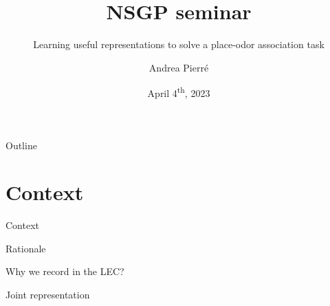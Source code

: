 \documentclass[bigger]{beamer}
\author{Andrea Pierré}
\date{April 4\textsuperscript{th}, 2023}
\title{NSGP seminar}
\subtitle{Learning useful representations to solve a place-odor association task}
\institute{Brown University}
\begin{document}
\maketitle
\begin{frame}[plain]{Outline}
\tableofcontents
\end{frame}

\section{Context}
\label{sec:orgff87777}
\begin{frame}[label={sec:orge12060c}]{Context}
\end{frame}
\begin{frame}[label={sec:orgd08aaca}]{Rationale}
\begin{block}{Why we record in the LEC?}
\end{block}
\end{frame}
\begin{frame}[label={sec:org594741b}]{Joint representation}
\end{frame}
\end{document}
